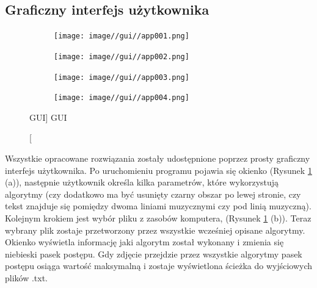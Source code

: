 \documentclass[a4paper,12pt]{article}
\begin{document}
        \subsection{Graficzny interfejs użytkownika}
	        \begin{figure}[h!]
                \centering
                \begin{subfigure}[b]{0.47\linewidth}
                    \texttt{[image: image//gui//app001.png]}
					\caption{}
                \end{subfigure}
                \begin{subfigure}[b]{0.47\linewidth}
                     \texttt{[image: image//gui//app002.png]}
					\caption{}
                \end{subfigure}
                \newline
                
				\begin{subfigure}[b]{0.47\linewidth}
                    \texttt{[image: image//gui//app003.png]}
					\caption{}
                \end{subfigure}
                \begin{subfigure}[b]{0.47\linewidth}
                    \texttt{[image: image//gui//app004.png]}
					\caption{}
                \end{subfigure}
                \caption
                    [GUI]
					{GUI}
					\label{fig:gui}
            \end{figure}
            
             Wszystkie opracowane rozwiązania zostały udostępnione poprzez prosty graficzny interfejs użytkownika. Po uruchomieniu programu pojawia się okienko (Rysunek \ref{fig:gui} (a)), następnie  użytkownik określa kilka parametrów, które wykorzystują algorytmy (czy dodatkowo ma być usunięty czarny obszar po lewej stronie, czy tekst znajduje się pomiędzy dwoma liniami muzycznymi czy pod linią muzyczną). Kolejnym krokiem jest wybór pliku z zasobów komputera, (Rysunek \ref{fig:gui} (b)). Teraz wybrany plik zostaje przetworzony przez wszystkie wcześniej opisane algorytmy. Okienko wyświetla informację jaki algorytm został wykonany i zmienia się niebieski pasek postępu. Gdy zdjęcie przejdzie przez wszystkie algorytmy pasek postępu osiąga wartość maksymalną i zostaje wyświetlona ścieżka do wyjściowych plików .txt.
	        
	   \newpage  
\end{document}
